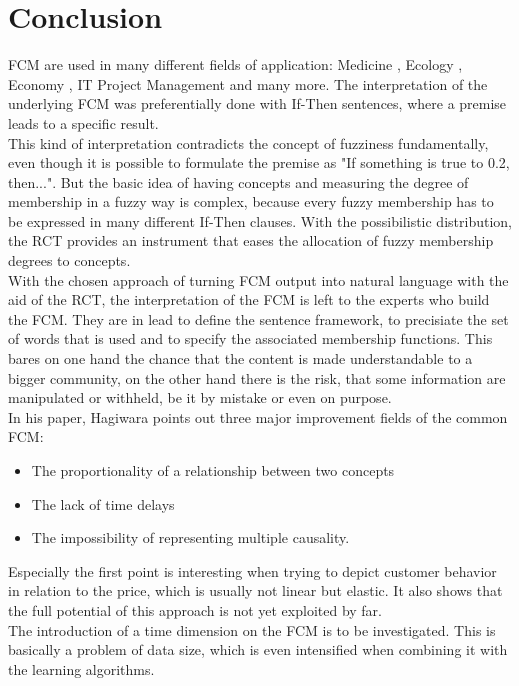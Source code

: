 \documentclass[conference]{IEEEtran}
\begin{document}
\section{Conclusion}
FCM are used in many different fields of application: Medicine \cite{georgopoulos2003}, Ecology \cite{ozesmi2004}, Economy \cite{carvalho2004}, IT Project Management \cite{rodriguez2007} and many more. The interpretation of the underlying FCM was preferentially done with If-Then sentences, where a premise leads to a specific result.\\
This kind of interpretation contradicts the concept of fuzziness fundamentally, even though it is possible to formulate the premise as "If something is true to 0.2, then...". But the basic idea of having concepts and measuring the degree of membership in a fuzzy way is complex, because every fuzzy membership has to be expressed in many different If-Then clauses. With the possibilistic distribution, the RCT provides an instrument that eases the allocation of fuzzy membership degrees to concepts.\\
With the chosen approach of turning FCM output into natural language with the aid of the RCT, the interpretation of the FCM is left to the experts who build the FCM. They are in lead to define the sentence framework, to precisiate the set of words that is used and to specify the associated membership functions. This bares on one hand the chance that the content is made understandable to a bigger community, on the other hand there is the risk, that some information are manipulated or withheld, be it by mistake or even on purpose.\\
In his paper, Hagiwara \cite{hagiwara1992} points out three major improvement fields of the common FCM: 
\begin{itemize}
\item The proportionality of a relationship between two concepts
\item The lack of time delays
\item The impossibility of representing multiple causality. 
\end{itemize}
Especially the first point is interesting when trying to depict customer behavior in relation to the price, which is usually not linear but elastic. It also shows that the full potential of this approach is not yet exploited by far.\\
The introduction of a time dimension on the FCM is to be investigated. This is basically a problem of data size, which is even intensified when combining it with the learning algorithms.\\
\end{document}
